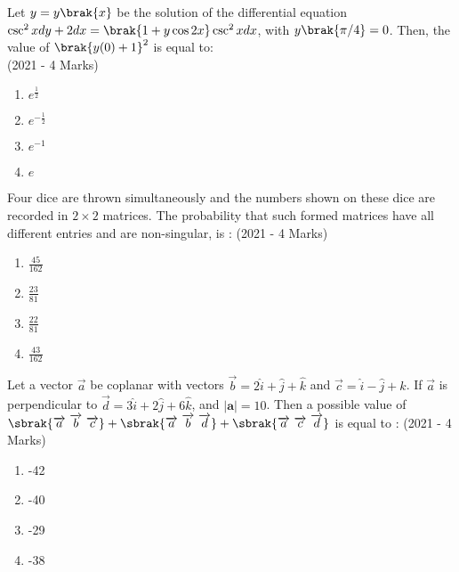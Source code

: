     \item{
     
            Let $y=y\brak{x}$ be the solution of the differential equation $\csc^2x dy + 2dx = \brak{1+y \cos 2x} \csc^2x dx$, with $y\brak{\pi/4} = 0$. Then, the value of $\brak{y(0)+1}^2$ is equal to: \\ \text{ }
            \hfill
            {(2021 - 4 Marks)}
            \begin{multicols}{4}
                \begin{enumerate}
                	\item $e^\frac{1}{2}$
                	\item $e^{-\frac{1}{2}}$
                	\item $e^{-1}$
                	\item $e$
                \end{enumerate}
            \end{multicols}
        
        }
    \item{
            Four dice are thrown simultaneously and the numbers shown on these dice are recorded in $2\times 2$
            matrices. The probability that such formed matrices have all different entries and are non-singular, is :
           	\hfill
                {(2021 - 4 Marks)}
            
            \begin{multicols}{4}
				\begin{enumerate}
					\item $\frac{45}{162}$
					\item $\frac{23}{81}$
					\item $\frac{22}{81}$
					\item $\frac{43}{162}$
				\end{enumerate}
			\end{multicols}
        
        }
 	\item{
        	Let a vector $\overrightarrow{a}$ be coplanar with vectors $\overrightarrow{b} = 2\hat{i} + \hat{j}  + \hat{k} $ and $\overrightarrow{c} = \hat{i}  - \hat{j}  + \hat{k} $. If $\overrightarrow{a}$ is perpendicular to $\overrightarrow{d} = 3\hat{i} + 2\hat{j} + 6\hat{k}$, and $|\textbf{a}| = 10$. Then a possible value of $\sbrak{\overrightarrow{a}\text{ }\overrightarrow{b}\text{ }\overrightarrow{c}}+\sbrak{\overrightarrow{a}\text{ }\overrightarrow{b}\text{ }\overrightarrow{d}}+\sbrak{\overrightarrow{a}\text{ }\overrightarrow{c}\text{ }\overrightarrow{d}} $ is equal to :\text{ }
        	\hfill
        	{(2021 - 4 Marks)}
        	
        	\begin{multicols}{4}
        		\begin{enumerate}
					\item -42
					
					\item -40
					
					\item -29
					\item -38
        		\end{enumerate}
        	\end{multicols}
        	
        }
